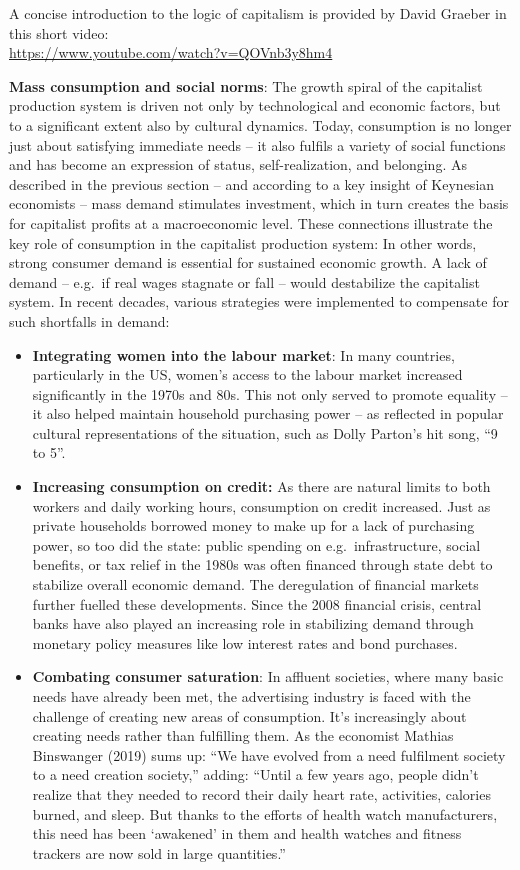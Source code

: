 \documentclass[
  a4paper,
  DIV=11,
  numbers=noendperiod,
  oneside,
  openany]{scrreprt}
\begin{document}
A concise introduction to the logic of capitalism is provided by David
Graeber in this short video:\\
\url{https://www.youtube.com/watch?v=QOVnb3y8hm4}

\textbf{Mass consumption and social norms}: The growth spiral of the
capitalist production system is driven not only by technological and
economic factors, but to a significant extent also by cultural dynamics.
Today, consumption is no longer just about satisfying immediate needs --
it also fulfils a variety of social functions and has become an
expression of status, self-realization, and belonging. As described in
the previous section -- and according to a key insight of Keynesian
economists -- mass demand stimulates investment, which in turn creates
the basis for capitalist profits at a macroeconomic level. These
connections illustrate the key role of consumption in the capitalist
production system: In other words, strong consumer demand is essential
for sustained economic growth. A lack of demand -- e.g.~if real wages
stagnate or fall -- would destabilize the capitalist system. In recent
decades, various strategies were implemented to compensate for such
shortfalls in demand:

\begin{itemize}
\item
  \textbf{Integrating women into the labour market}: In many countries,
  particularly in the US, women's access to the labour market increased
  significantly in the 1970s and 80s. This not only served to promote
  equality -- it also helped maintain household purchasing power -- as
  reflected in popular cultural representations of the situation, such
  as Dolly Parton's hit song, ``9 to 5''.
\item
  \textbf{Increasing consumption on credit:} As there are natural limits
  to both workers and daily working hours, consumption on credit
  increased. Just as private households borrowed money to make up for a
  lack of purchasing power, so too did the state: public spending on
  e.g.~infrastructure, social benefits, or tax relief in the 1980s was
  often financed through state debt to stabilize overall economic
  demand. The deregulation of financial markets further fuelled these
  developments. Since the 2008 financial crisis, central banks have also
  played an increasing role in stabilizing demand through monetary
  policy measures like low interest rates and bond purchases.
\item
  \textbf{Combating consumer saturation}: In affluent societies, where
  many basic needs have already been met, the advertising industry is
  faced with the challenge of creating new areas of consumption. It's
  increasingly about creating needs rather than fulfilling them. As the
  economist Mathias Binswanger (2019) sums up: ``We have evolved from a
  need fulfilment society to a need creation society,'' adding: ``Until
  a few years ago, people didn't realize that they needed to record
  their daily heart rate, activities, calories burned, and sleep. But
  thanks to the efforts of health watch manufacturers, this need has
  been `awakened' in them and health watches and fitness trackers are
  now sold in large quantities.''
\end{itemize}
\end{document}

